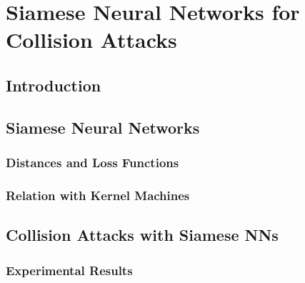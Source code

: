 
\chapter{Siamese Neural Networks for Collision Attacks} %

\label{ChapterSiamese}


\section{Introduction}


\section{Siamese Neural Networks}
\subsection{Distances and Loss Functions}
\subsection{Relation with Kernel Machines}


\section{Collision Attacks with Siamese NNs}
\subsection{Experimental Results}
